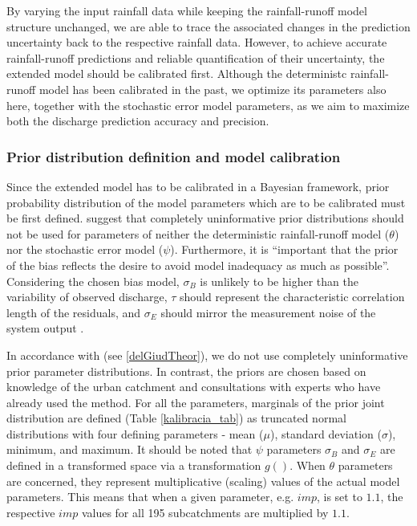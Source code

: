 \documentclass{ctuthesis}\usepackage[]{graphicx}\usepackage[]{color}
\begin{document}
By varying the input rainfall data while keeping the rainfall-runoff model structure unchanged, we are able to trace the associated changes in the prediction uncertainty back to the respective rainfall data. However, to achieve accurate rainfall-runoff predictions and reliable quantification of their uncertainty, the extended model should be calibrated first. Although the deterministc rainfall-runoff model has been calibrated in the past, we optimize its parameters also here, together with the stochastic error model parameters, as we aim to maximize both the discharge prediction accuracy and precision.


\subsubsection{Prior distribution definition and model calibration} \label{priors_calibr}

Since the extended model has to be calibrated in a Bayesian framework, prior probability distribution of the model parameters which are to be calibrated must be first defined. \cite{giudice2013improving} suggest that completely uninformative prior distributions should not be used for parameters of neither the deterministic rainfall-runoff model ($\theta$) nor  the stochastic error model ($\psi$). Furthermore, it is \enquote{important that the prior of the bias reflects the desire to avoid model inadequacy as much as possible}. Considering the chosen bias model, $\sigma_{B}$ is unlikely to be higher than the variability of observed discharge, $\tau$ should represent the characteristic correlation length of the residuals, and  $\sigma_E$ should mirror the measurement noise of the system output \cite{giudice2013improving}.

In accordance with \cite{giudice2013improving} (see \ref{delGiudTheor}), we do not use completely uninformative prior parameter distributions. In contrast, the priors are chosen based on knowledge of the urban catchment and consultations with experts who have already used the method. For all the parameters, marginals of the prior joint distribution are defined (Table \ref{kalibracia_tab}) as truncated normal distributions with four defining parameters - mean ($\mu$), standard deviation ($\sigma$), minimum, and maximum. It should be noted that $\psi$ parameters $\sigma_B$ and  $\sigma_E$ are defined in a transformed space via a transformation $g()$.  When $\theta$ parameters are concerned, they represent multiplicative (scaling) values of the actual model parameters. This means that when a given parameter, e.g. $imp$, is set to $1.1$, the respective $imp$ values for all 195 subcatchments are multiplied by $1.1$.
\end{document}
